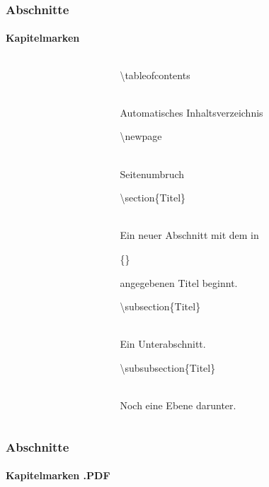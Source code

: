 \begin{frame}
\frametitle{Abschnitte}
\framesubtitle{Kapitelmarken}
\begin{columns}
\begin{column}{0.5\textwidth}
\begin{ttfamily}\footnotesize

\end{ttfamily}
\end{column}
\begin{column}{0.5\textwidth}

\begin{ttfamily}\color{nounibaredI}\textbackslash tableofcontents\color{black}\end{ttfamily}\\
Automatisches Inhaltsverzeichnis\\[3mm]
\begin{ttfamily}\color{nounibaredI}\textbackslash newpage\color{black}\end{ttfamily}\\
Seitenumbruch\\[3mm]
\begin{ttfamily}\color{unibablueI}\textbackslash section\color{black}\{Titel\}\end{ttfamily}\\
Ein neuer Abschnitt mit dem in \begin{ttfamily}\{\}\end{ttfamily} angegebenen Titel
beginnt.\\[3mm]
\begin{ttfamily}\color{unibablueI}\textbackslash subsection\color{black}\{Titel\}\end{ttfamily}\\
Ein Unterabschnitt.\\[3mm]
\begin{ttfamily}\color{unibablueI}\textbackslash subsubsection\color{black}\{Titel\}\end{ttfamily}\\
Noch eine Ebene darunter.\\
\end{column}
\end{columns}
\end{frame}


\begin{frame}
\frametitle{Abschnitte}
\framesubtitle{Kapitelmarken .PDF}
\begin{columns}
\begin{column}{0.5\textwidth}
\begin{ttfamily}\footnotesize

\end{ttfamily}
\end{column}
\begin{column}{0.5\textwidth}
\end{column}
\end{columns}
\end{frame}

